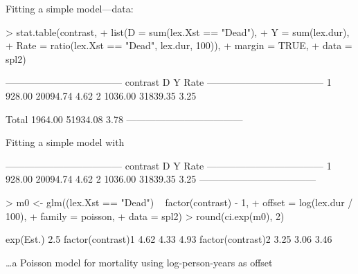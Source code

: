 \begin{frame}[fragile]{Fitting a simple model---data:}
\begin{Schunk}
\begin{Sinput}
> stat.table(contrast,
+            list(D = sum(lex.Xst == "Dead"),
+                 Y = sum(lex.dur),
+              Rate = ratio(lex.Xst == "Dead", lex.dur, 100)),
+            margin = TRUE,
+              data = spl2)
\end{Sinput}
\begin{Soutput}
 ------------------------------------ 
 contrast         D        Y    Rate  
 ------------------------------------ 
 1           928.00 20094.74    4.62  
 2          1036.00 31839.35    3.25  
                                      
 Total      1964.00 51934.08    3.78  
 ------------------------------------ 
\end{Soutput}
\end{Schunk}
\end{frame}

\begin{frame}[fragile]{Fitting a simple model with }
\begin{Schunk}
\begin{Soutput}
 ------------------------------------ 
 contrast         D        Y    Rate  
 ------------------------------------ 
 1           928.00 20094.74    4.62  
 2          1036.00 31839.35    3.25  
 ------------------------------------ 
\end{Soutput}
\end{Schunk}
\begin{Schunk}
\begin{Sinput}
> m0 <- glm((lex.Xst == "Dead") ~ factor(contrast) - 1,
+           offset = log(lex.dur / 100),
+           family = poisson,
+             data = spl2)
> round(ci.exp(m0), 2)
\end{Sinput}
\begin{Soutput}
                  exp(Est.) 2.5%
factor(contrast)1      4.62 4.33  4.93
factor(contrast)2      3.25 3.06  3.46
\end{Soutput}
\end{Schunk}
\small
\ldots a Poisson model for mortality using log-person-years as offset
\end{frame}

